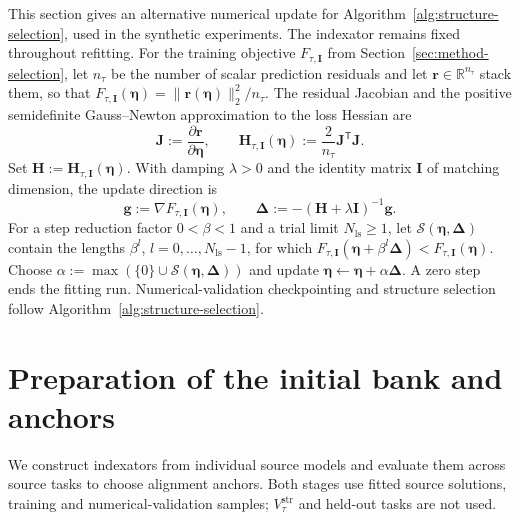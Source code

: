 This section gives an alternative numerical update for
Algorithm~\ref{alg:structure-selection}, used in the synthetic
experiments. The indexator remains fixed throughout refitting.
For the training objective $F_{\tau,\mathbf I}$ from
Section~\ref{sec:method-selection}, let $n_\tau$ be the number of
scalar prediction residuals and let $\mathbf r\in\mathbb R^{n_\tau}$
stack them, so that
$F_{\tau,\mathbf I}(\boldsymbol\eta)=
\|\mathbf r(\boldsymbol\eta)\|_2^2/n_\tau$.
The residual Jacobian and the positive semidefinite Gauss--Newton
approximation to the loss Hessian are
\begin{equation}
    \mathbf J:=\frac{\partial\mathbf r}{\partial\boldsymbol\eta},
    \qquad
    \mathbf H_{\tau,\mathbf I}(\boldsymbol\eta)
        :=\frac{2}{n_\tau}\mathbf J^{\mathsf T}\mathbf J.
    \label{eq:method-gn-matrix}
\end{equation}
Set $\mathbf H:=\mathbf H_{\tau,\mathbf I}(\boldsymbol\eta)$.
With damping $\lambda>0$ and the identity matrix $\mathbf I$
of matching dimension, the update direction is
\begin{equation}
    \mathbf g:=\nabla F_{\tau,\mathbf I}(\boldsymbol\eta),
    \qquad
    \boldsymbol\Delta:=
        -(\mathbf H+\lambda\mathbf I)^{-1}\mathbf g.
    \label{eq:method-numerical-update}
\end{equation}
For a step reduction factor $0<\beta<1$ and a trial limit
$N_{\mathrm{ls}}\ge1$, let
$\mathcal S(\boldsymbol\eta,\boldsymbol\Delta)$ contain the lengths
$\beta^l$, $l=0,\ldots,N_{\mathrm{ls}}-1$, for which
$F_{\tau,\mathbf I}(\boldsymbol\eta+\beta^l\boldsymbol\Delta)
<F_{\tau,\mathbf I}(\boldsymbol\eta)$.
Choose $\alpha:=\max(\{0\}\cup
\mathcal S(\boldsymbol\eta,\boldsymbol\Delta))$ and update
$\boldsymbol\eta\leftarrow\boldsymbol\eta+\alpha\boldsymbol\Delta$.
A zero step ends the fitting run. Numerical-validation checkpointing
and structure selection follow Algorithm~\ref{alg:structure-selection}.

\section{Preparation of the initial bank and anchors}
\label{app:bank-preparation}

We construct indexators from individual source models and evaluate
them across source tasks to choose alignment anchors. Both stages
use fitted source solutions, training and numerical-validation samples;
$V_\tau^{\mathrm{str}}$ and held-out tasks are not used.

